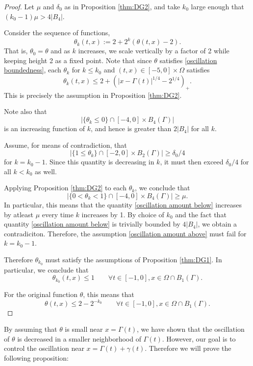 \documentclass[11pt]{amsart}
\theoremstyle{remark}
\theoremstyle{definition}
\newcommand{\paren}[1]{\left( #1 \right)}
\newcommand{\abs}[1]{\left\lvert #1 \right\rvert}
\begin{document}
\begin{proof}
Let $\mu$ and $\delta_0$ as in Proposition \ref{thm:DG2}, and take $k_0$ large enough that $(k_0-1) \mu > 4 |B_4|$.  

Consider the sequence of functions,
\[ \theta_k(t,x) := 2 + 2^k (\theta(t,x) - 2). \]
That is, $\theta_0 = \theta$ and as $k$ increases, we scale vertically by a factor of 2 while keeping height 2 as a fixed point.  Note that since $\theta$ satisfies \eqref{oscillation boundedness}, each $\theta_k$ for $k \leq k_0$ and $(t,x) \in [-5,0] \times \Omega$ satisfies
\[ \theta_k(t,x) \leq 2 + \paren{|x-\Gamma(t)|^{1/4}-2^{1/4}}_+. \]
This is precisely the assumption in Proposition \ref{thm:DG2}.  

Note also that
\begin{equation} \label{oscillation amount below} \abs{\{\theta_k \leq 0\} \cap [-4,0]\times B_4(\Gamma)} \end{equation}
is an increasing function of $k$, and hence is greater than $2|B_4|$ for all $k$.  

Assume, for means of contradiction, that
\begin{equation} \label{oscillation amount above} \abs{\{1 \leq \theta_k \} \cap [-2,0]\times B_2(\Gamma)} \geq \delta_0/4 \end{equation}
for $k = k_0-1$.  Since this quantity is decreasing in $k$, it must then exceed $\delta_0/4$ for all $ k < k_0$ as well.  

Applying Proposition \ref{thm:DG2} to each $\theta_k$, we conclude that 
\[ \abs{\{0 < \theta_k < 1\} \cap [-4,0]\times B_4(\Gamma)} \geq \mu. \]
In particular, this means that the quantity \eqref{oscillation amount below} increases by atleast $\mu$ every time $k$ increases by 1. By choice of $k_0$ and the fact that quantity \eqref{oscillation amount below} is trivially bounded by $4|B_4|$, we obtain a contradiciton.  Therefore, the assumption \eqref{oscillation amount above} must fail for $k = k_0-1$.  

Therefore $\theta_{k_0}$ must satisfy the assumptions of Proposition \ref{thm:DG1}.  In particular, we conclude that
\[ \theta_{k_0}(t,x) \leq 1 \qquad \forall t \in [-1,0], x \in \Omega \cap B_1(\Gamma). \]

For the original function $\theta$, this means that
\[ \theta(t,x) \leq 2 - 2^{-k_0} \qquad \forall t \in [-1,0], x \in \Omega \cap B_1(\Gamma). \]
\end{proof}

By assuming that $\theta$ is small near $x = \Gamma(t)$, we have shown that the oscillation of $\theta$ is decreased in a smaller neighborhood of $\Gamma(t)$.  However, our goal is to control the oscillation near $x = \Gamma(t) + \gamma(t)$.  Therefore we will prove the following proposition:
\end{document}
